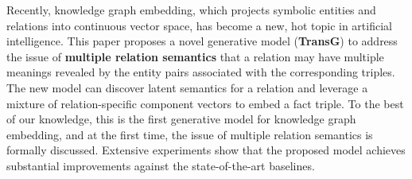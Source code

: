 Recently, knowledge graph embedding, which projects symbolic entities and relations into continuous vector space, has become a new, hot topic in artificial intelligence. This paper proposes a novel generative model (\textbf{TransG}) to address the issue of \textbf{multiple relation semantics} that a relation may have multiple meanings revealed by the entity pairs associated with the corresponding triples. The new model can discover latent semantics for a relation and leverage a mixture of relation-specific component vectors to embed a fact triple. To the best of our knowledge, this is the first generative model for knowledge graph embedding, and at the first time, the issue of multiple relation semantics is formally discussed. Extensive experiments show that the proposed model achieves substantial improvements against the state-of-the-art baselines.
